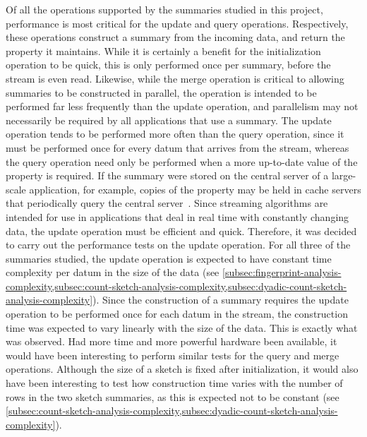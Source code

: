 Of all the operations supported by the summaries studied in this project, performance is most critical for the update and query operations.
Respectively, these operations construct a summary from the incoming data, and return the property it maintains.
While it is certainly a benefit for the initialization operation to be quick, this is only performed once per summary, before the stream is even read.
Likewise, while the merge operation is critical to allowing summaries to be constructed in parallel, the operation is intended to be performed far less frequently than the update operation, and parallelism may not necessarily be required by all applications that use a summary.
The update operation tends to be performed more often than the query operation, since it must be performed once for every datum that arrives from the stream, whereas the query operation need only be performed when a more up-to-date value of the property is required.
If the summary were stored on the central server of a large-scale application, for example, copies of the property may be held in cache servers that periodically query the central server~\citep{mershad10}.
Since streaming algorithms are intended for use in applications that deal in real time with constantly changing data, the update operation must be efficient and quick.
Therefore, it was decided to carry out the performance tests on the update operation.
For all three of the summaries studied, the update operation is expected to have constant time complexity per datum in the size of the data (see \cref{subsec:fingerprint-analysis-complexity,subsec:count-sketch-analysis-complexity,subsec:dyadic-count-sketch-analysis-complexity}).
Since the construction of a summary requires the update operation to be performed once for each datum in the stream, the construction time was expected to vary linearly with the size of the data.
This is exactly what was observed.
Had more time and more powerful hardware been available, it would have been interesting to perform similar tests for the query and merge operations.
Although the size of a sketch is fixed after initialization, it would also have been interesting to test how construction time varies with the number of rows in the two sketch summaries, as this is expected not to be constant (see \cref{subsec:count-sketch-analysis-complexity,subsec:dyadic-count-sketch-analysis-complexity}).

